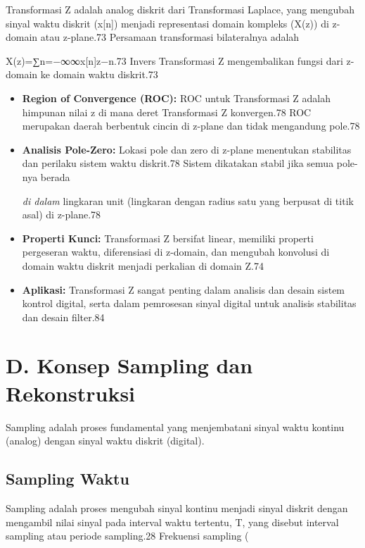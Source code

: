 \documentclass[
  letterpaper,
  DIV=11,
  numbers=noendperiod]{scrreprt}
\begin{document}
Transformasi Z adalah analog diskrit dari Transformasi Laplace, yang
mengubah sinyal waktu diskrit (x{[}n{]}) menjadi representasi domain
kompleks (X(z)) di z-domain atau z-plane.73 Persamaan transformasi
bilateralnya adalah

X(z)=∑n=−∞∞\hspace{0pt}x{[}n{]}z−n.73 Invers Transformasi Z
mengembalikan fungsi dari z-domain ke domain waktu diskrit.73

\begin{itemize}
\item
  \textbf{Region of Convergence (ROC):} ROC untuk Transformasi Z adalah
  himpunan nilai z di mana deret Transformasi Z konvergen.78 ROC
  merupakan daerah berbentuk cincin di z-plane dan tidak mengandung
  pole.78
\item
  \textbf{Analisis Pole-Zero:} Lokasi pole dan zero di z-plane
  menentukan stabilitas dan perilaku sistem waktu diskrit.78 Sistem
  dikatakan stabil jika semua pole-nya berada

  \emph{di dalam} lingkaran unit (lingkaran dengan radius satu yang
  berpusat di titik asal) di z-plane.78
\item
  \textbf{Properti Kunci:} Transformasi Z bersifat linear, memiliki
  properti pergeseran waktu, diferensiasi di z-domain, dan mengubah
  konvolusi di domain waktu diskrit menjadi perkalian di domain Z.74
\item
  \textbf{Aplikasi:} Transformasi Z sangat penting dalam analisis dan
  desain sistem kontrol digital, serta dalam pemrosesan sinyal digital
  untuk analisis stabilitas dan desain filter.84
\end{itemize}

\section{D. Konsep Sampling dan
Rekonstruksi}\label{d.-konsep-sampling-dan-rekonstruksi}

Sampling adalah proses fundamental yang menjembatani sinyal waktu
kontinu (analog) dengan sinyal waktu diskrit (digital).

\subsection{Sampling Waktu}\label{sampling-waktu}

Sampling adalah proses mengubah sinyal kontinu menjadi sinyal diskrit
dengan mengambil nilai sinyal pada interval waktu tertentu, T, yang
disebut interval sampling atau periode sampling.28 Frekuensi sampling (
\end{document}
